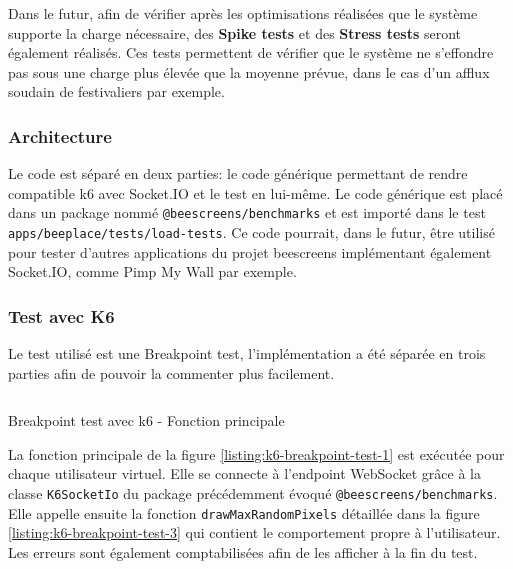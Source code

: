 Dans le futur, afin de vérifier après les optimisations réalisées que le système supporte la charge nécessaire, des \textbf{Spike tests} et des \textbf{Stress tests} seront également réalisés. Ces tests permettent de vérifier que le système ne s'effondre pas sous une charge plus élevée que la moyenne prévue, dans le cas d'un afflux soudain de festivaliers par exemple.

\subsubsection{Architecture}

Le code est séparé en deux parties: le code générique permettant de rendre compatible k6 avec Socket.IO et le test en lui-même. Le code générique est placé dans un package nommé \texttt{@beescreens/benchmarks} et est importé dans le test \texttt{apps/beeplace/tests/load-tests}. Ce code pourrait, dans le futur, être utilisé pour tester d'autres applications du projet \gls{beescreens} implémentant également Socket.IO, comme Pimp My Wall par exemple.


\subsubsection{Test avec K6}

Le test utilisé est une Breakpoint test, l'implémentation a été séparée en trois parties afin de pouvoir la commenter plus facilement.

\begin{listing}[H]
  \inputminted{ts}{assets/figures/breakpoint-test-1.ts}
  \caption{Breakpoint test avec k6 - Fonction principale}
  \label{listing:k6-breakpoint-test-1}
\end{listing}

La fonction principale de la figure \ref{listing:k6-breakpoint-test-1} est exécutée pour chaque utilisateur virtuel. Elle se connecte à l'endpoint WebSocket grâce à la classe \texttt{K6SocketIo} du package précédemment évoqué \texttt{@beescreens/benchmarks}. Elle appelle ensuite la fonction \texttt{drawMaxRandomPixels} détaillée dans la figure \ref{listing:k6-breakpoint-test-3} qui contient le comportement propre à l'utilisateur. Les erreurs sont également comptabilisées afin de les afficher à la fin du test.

